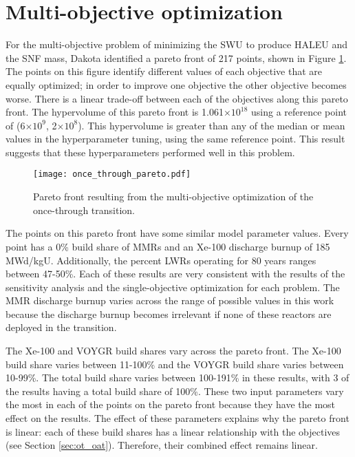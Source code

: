 \section{Multi-objective optimization}
For the multi-objective problem of minimizing the \gls{SWU} to produce 
\gls{HALEU} and the \gls{SNF} mass, Dakota identified a pareto front 
of 217 points, shown in Figure \ref{fig:once_through_pareto}. The points 
on this figure identify different values of each objective that are equally 
optimized; in order to improve one objective the other objective becomes 
worse. There is a linear trade-off between each of the objectives along this 
pareto front. 
The hypervolume of this pareto front is 1.061$\times 10^18$ using a 
reference point of (6$\times 10^9$, 2$\times 10^8$). This hypervolume is 
greater than any of the median or mean values in the hyperparameter tuning,
using the same reference point. This result suggests that these hyperparameters 
performed well in this problem. 


\begin{figure}[ht]
    \centering 
    \texttt{[image: once\_through\_pareto.pdf]}
    \caption{Pareto front resulting from the multi-objective optimization 
    of the once-through transition.}
    \label{fig:once_through_pareto}
\end{figure}

The points on this pareto front have some similar model parameter values. 
Every point has a 0\% build share of \glspl{MMR} and an Xe-100 discharge 
burnup of 185 MWd/kgU. Additionally, the percent \glspl{LWR} operating 
for 80 years ranges between 47-50\%. Each of these results are very 
consistent with the results of the sensitivity analysis and the 
single-objective optimization for each problem. The \gls{MMR} discharge burnup varies 
across the range of possible values in this work because the discharge 
burnup becomes irrelevant if none of these reactors are deployed in the
transition.

The Xe-100 and VOYGR build shares vary across the pareto front. The Xe-100 
build share varies between 11-100\% and the VOYGR build share varies 
between 10-99\%. The total build share varies between 100-191\% in these 
results, with 3 of the results having a total build share of 100\%. 
These two input parameters vary the most in each of the points on 
the pareto front because they have the most effect on the results. The effect of 
these parameters explains why the pareto front is linear: each of these 
build shares has a linear relationship with the objectives (see Section 
\ref{sec:ot_oat}). Therefore, their combined effect remains linear.

